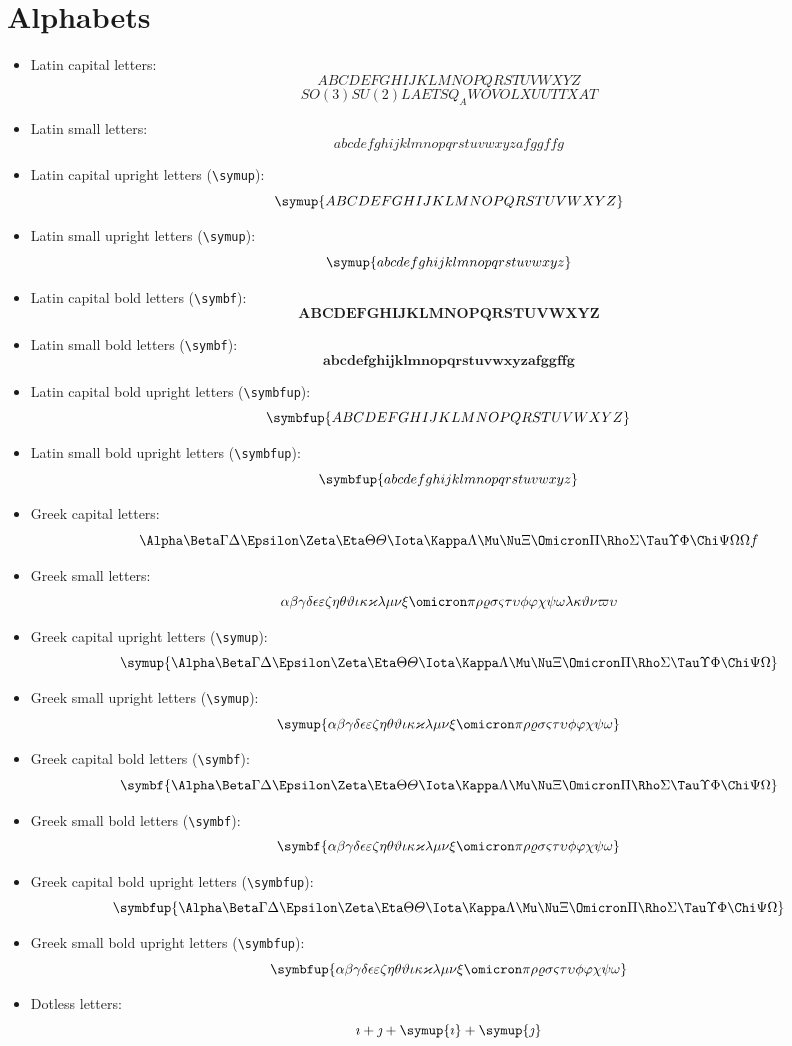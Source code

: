 \documentclass{article}
\def\Latinalphabets{ABCDEFGHIJKLMNOPQRSTUVWXYZ}
\def\latinalphabets{abcdefghijklmnopqrstuvwxyz}
\def\Greekalphabets{%
  \Alpha      \Beta       \Gamma      \Delta      \Epsilon
  \Zeta       \Eta        \Theta      \varTheta   \Iota
  \Kappa      \Lambda     \Mu         \Nu         \Xi
  \Omicron    \Pi         \Rho        \Sigma      \Tau
  \Upsilon    \Phi        \Chi        \Psi        \Omega
}
\def\greekalphabets{%
  \alpha      \beta       \gamma      \delta      \epsilon
  \varepsilon \zeta       \eta        \theta      \vartheta 
  \iota       \kappa      \varkappa   \lambda     \mu
  \nu         \xi         \omicron    \pi         \rho
  \varrho     \sigma      \varsigma   \tau        \upsilon
  \phi        \varphi     \chi        \psi        \omega
}
\begin{document}
\section{Alphabets}

\begin{itemize}
  \item Latin capital letters:
        \[ \Latinalphabets\]
		\[SO(3)SU(2)LAETSQ_AWOVO LX UUTTXAT\]
  \item Latin small letters:
        \[ \latinalphabets afggffg\]

  \item Latin capital upright letters (\verb|\symup|):
        \[ \symup{\Latinalphabets} \]

  \item Latin small upright letters (\verb|\symup|):
        \[ \symup{\latinalphabets} \]

  \item Latin capital bold letters (\verb|\symbf|):
        \[ \symbf{\Latinalphabets} \]

  \item Latin small bold letters (\verb|\symbf|):
        \[ \symbf{\latinalphabets afggffg}\]

  \item Latin capital bold upright letters (\verb|\symbfup|):
        \[ \symbfup{\Latinalphabets} \]

  \item Latin small bold upright letters (\verb|\symbfup|):
        \[ \symbfup{\latinalphabets} \]

  \item Greek capital letters:
        \[ \Greekalphabets \Omega f \]

  \item Greek small letters:
        \[ \greekalphabets \lambda\kappa\vartheta\nu\varpi\upsilon\]

  \item Greek capital upright letters (\verb|\symup|):
        \[ \symup{\Greekalphabets} \]

  \item Greek small upright letters (\verb|\symup|):
        \[ \symup{\greekalphabets} \]

  \item Greek capital bold letters (\verb|\symbf|):
        \[ \symbf{\Greekalphabets} \]

  \item Greek small bold letters (\verb|\symbf|):
        \[ \symbf{\greekalphabets} \]

  \item Greek capital bold upright letters (\verb|\symbfup|):
        \[ \symbfup{\Greekalphabets} \]

  \item Greek small bold upright letters (\verb|\symbfup|):
        \[ \symbfup{\greekalphabets} \]

  \item Dotless letters:
        \[ \imath + \jmath + \symup{\imath} + \symup{\jmath} \]
\end{itemize}
\end{document}

